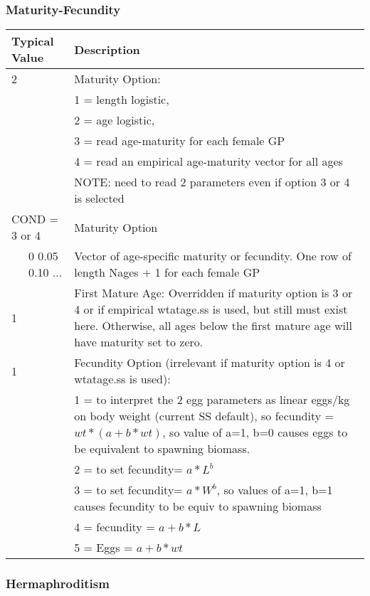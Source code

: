 \subsubsection{Maturity-Fecundity}


\begin{longtable}{p{0.5cm} p{2cm} p{12cm}}
		\multicolumn{2}{l}{Typical Value} & Description \\
		\hline
	    2 & & Maturity Option: \\
	     & & 1 = length logistic,\\
	     & & 2 = age logistic,\\
	     & & 3 = read age-maturity for each female GP\\
	     & & 4 = read an empirical age-maturity vector for all ages\\
	     & & NOTE: need to read 2 parameters even if option 3 or 4 is selected \\
	   \hline

	   \multicolumn{2}{l}{COND = 3 or 4} & Maturity Option\\
	   & 0 0.05 0.10 ... & Vector of age-specific maturity or fecundity.  One row of length Nages + 1 for each female GP\\
	   \hline
	   
	   1 & & First Mature Age: Overridden if maturity option is 3 or 4 or if empirical wtatage.ss is used, but still must exist here.  Otherwise, all ages below the first mature age will have maturity set to zero.\\
	   \hline	  

	   1 & & Fecundity Option (irrelevant if maturity option is 4 or wtatage.ss is used):\\
	     & & 1 = to  interpret the 2 egg parameters as linear eggs/kg on body weight (current SS default),  so fecundity = $wt * (a+b*wt)$, so value of a=1, b=0 causes eggs to be equivalent to spawning biomass.\\
	     & & 2 = to set fecundity= $a*L^ b$\\
	     & & 3 = to set fecundity= $a*W^ b$, so values of a=1, b=1 causes fecundity to be equiv to spawning biomass\\
	     & & 4 = fecundity = $a+b*L$\\
	     & & 5 = Eggs = $a+b*wt$\\
	  \hline
	\end{longtable}

\subsubsection{Hermaphroditism}


